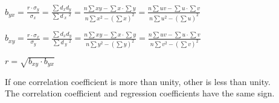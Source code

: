 \documentclass[Math.tex]{subfiles}
\begin{document}
$\displaystyle b_{yx} = \frac{r\cdot \sigma_y}{\sigma_x} = \frac{\sum d_x d_y}{\sum{d\!\,_x\!\!\;^2}} = 
\frac{n\sum xy - \sum x \cdot \sum y}{n\sum{x^2} - (\sum x)^2} = \frac{n\sum uv - \sum u \cdot \sum v}{n\sum{u^2} - (\sum u)^2}$

$\displaystyle b_{xy} = \frac{r\cdot \sigma_x}{\sigma_y} = \frac{\sum d_x d_y}{\sum{d\!\,_y\!\!\;^2}} = 
\frac{n\sum xy - \sum x \cdot \sum y}{n\sum{y^2} - (\sum y)^2} = \frac{n\sum uv - \sum u \cdot \sum v}{n\sum{v^2} - (\sum v)^2}$

$r = \sqrt{b_{xy} \cdot b_{yx}}$

If one correlation coefficient is more than unity, other is less than unity.\\
The correlation coefficient and regression coefficients have the same sign.
\end{document}
